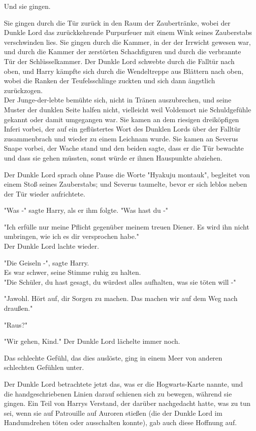 {Und sie gingen.

Sie gingen durch die Tür zurück in den Raum der Zaubertränke, wobei der Dunkle Lord das zurückkehrende Purpurfeuer mit einem Wink seines Zauberstabs verschwinden lies. Sie gingen durch die Kammer, in der der Irrwicht gewesen war, und durch die Kammer der zerstörten Schachfiguren und durch die verbrannte Tür der Schlüsselkammer. Der Dunkle Lord schwebte durch die Falltür nach oben, und Harry kämpfte sich durch die Wendeltreppe aus Blättern nach oben, wobei die Ranken der Teufelsschlinge zuckten und sich dann ängstlich zurückzogen.\\ Der Junge-der-lebte bemühte sich, nicht in Tränen auszubrechen, und seine Muster der dunklen Seite halfen nicht, vielleicht weil Voldemort nie Schuldgefühle gekannt oder damit umgegangen war. Sie kamen an dem riesigen dreiköpfigen Inferi vorbei, der auf ein geflüstertes Wort des Dunklen Lords über der Falltür zusammenbrach und wieder zu einem Leichnam wurde. Sie kamen an Severus Snape vorbei, der Wache stand und den beiden sagte, dass er die Tür bewachte und dass sie gehen müssten, sonst würde er ihnen Hauspunkte abziehen.

Der Dunkle Lord sprach ohne Pause die Worte "Hyakuju montauk", begleitet von einem Stoß seines Zauberstabs; und Severus taumelte, bevor er sich leblos neben der Tür wieder aufrichtete.

"Was -" sagte Harry, als er ihm folgte. "Was hast du -"

"Ich erfülle nur meine Pflicht gegenüber meinem treuen Diener. Es wird ihn nicht umbringen, wie ich es dir versprochen habe."\\ Der Dunkle Lord lachte wieder.

"Die Geiseln -", sagte Harry.\\ Es war schwer, seine Stimme ruhig zu halten.\\ "Die Schüler, du hast gesagt, du würdest alles aufhalten, was sie töten will -"

"Jawohl. Hört auf, dir Sorgen zu machen. Das machen wir auf dem Weg nach draußen."

"Raus?"

"Wir gehen, Kind." Der Dunkle Lord lächelte immer noch.

Das schlechte Gefühl, das dies auslöste, ging in einem Meer von anderen schlechten Gefühlen unter.

Der Dunkle Lord betrachtete jetzt das, was er die Hogwarts-Karte nannte, und die handgeschriebenen Linien darauf schienen sich zu bewegen, während sie gingen. Ein Teil von Harrys Verstand, der darüber nachgedacht hatte, was zu tun sei, wenn sie auf Patrouille auf Auroren stießen (die der Dunkle Lord im Handumdrehen töten oder ausschalten konnte), gab auch diese Hoffnung auf.

}
